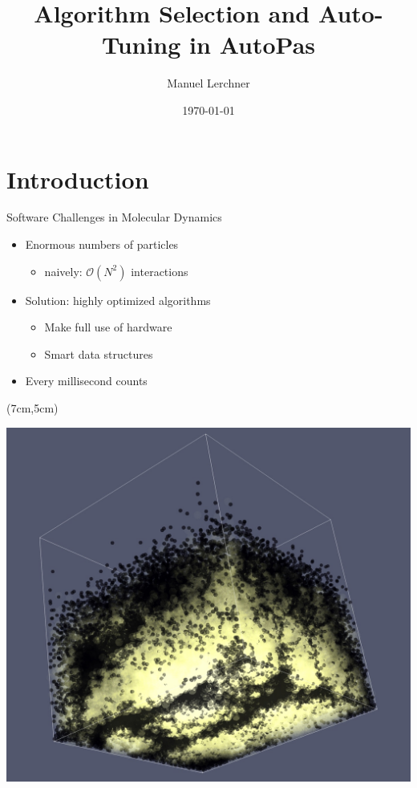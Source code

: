 \documentclass[
	10pt,
	t		%
]{beamer}
\title{Algorithm Selection and Auto-Tuning in AutoPas}
\author{Manuel Lerchner}
\date{\today}
\begin{document}
\maketitle

\setcounter{framenumber}{0}

\section{Introduction}

\begin{frame}{Software Challenges in Molecular Dynamics}
    \begin{itemize}
        \item Enormous numbers of particles
              \begin{itemize}
                  \item naively: $\mathcal{O}(N^2)$ interactions
              \end{itemize}
        \item Solution: highly optimized algorithms
              \begin{itemize}
                  \item Make full use of hardware
                  \item Smart data structures
              \end{itemize}
        \item Every millisecond counts
    \end{itemize}



    \begin{textblock*}{4.5cm}(7cm,5cm)
        \begin{center}
            \includegraphics[width=\textwidth]{figures/rayleigh_taylor_instability_3d.png}
        \end{center}
    \end{textblock*}



\end{frame}
\end{document}
